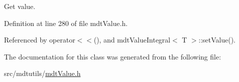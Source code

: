 Get value. 



Definition at line 280 of file mdt\-Value.\-h.



Referenced by operator$<$$<$(), and mdt\-Value\-Integral$<$ T $>$\-::set\-Value().



The documentation for this class was generated from the following file\-:\begin{DoxyCompactItemize}
\item 
src/mdtutils/\hyperlink{mdt_value_8h}{mdt\-Value.\-h}\end{DoxyCompactItemize}
